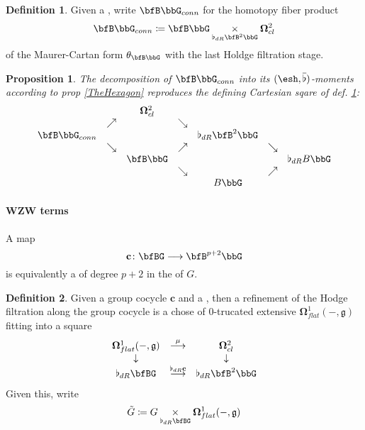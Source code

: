 \documentclass[12pt,titlepage]{article}
\newcommand{\itexarray}[1]{\begin{matrix}#1\end{matrix}}
\theoremstyle{plain}
\newtheorem{prop}{Proposition}
\theoremstyle{definition}
\newtheorem{defn}{Definition}
\theoremstyle{remark}
\begin{document}
\begin{defn}
\label{BGconn}\hypertarget{BGconn}{}
Given a , write $\bfB\bbG_{conn}$ for the homotopy fiber product
\begin{displaymath}
\bfB\bbG_{conn}
\coloneqq
\bfB\bbG\underset{\flat_{dR}\bfB^2\bbG}{\times} \mathbf{\Omega}^2_{cl}
\end{displaymath}
of the Maurer-Cartan form $\theta_{\bfB\bbG}$ with the last Holdge filtration stage.
\end{defn}
\begin{prop}
\label{}\hypertarget{}{}
The decomposition of $\bfB\bbG_{conn}$ into its $(\esh , \overline{\flat})$-moments according to prop \ref{TheHexagon} reproduces the defining Cartesian sqare of def. \ref{BGconn}:
\begin{displaymath}
\itexarray{
&& \mathbf{\Omega}^2_{cl}
\\
& \nearrow && \searrow
\\
\bfB\bbG_{conn}
&& &&
\flat_{dR}\bfB^2\bbG
\\
& \searrow && \nearrow && \searrow
\\
&& \bfB\bbG && &&  \flat_{dR}B \bbG
\\
&& & \searrow && \nearrow
\\
&& && B \bbG
}
\end{displaymath}
\end{prop}
\hypertarget{WZWTerms}{}\paragraph*{{WZW terms}}\label{WZWTerms}
A map
\begin{displaymath}
\mathbf{c} \colon \bfBG \longrightarrow \bfB^{p+2} \bbG
\end{displaymath}
is equivalently a  of degree $p+2$ in the  of $G$.
\begin{defn}
\label{FormRefinementOfCocycle}\hypertarget{FormRefinementOfCocycle}{}
Given a group cocycle $\mathbf{c}$ and a , then a refinement of the Hodge filtration along the group cocycle is a chose of 0-trucated extensive $\mathbf{\Omega}^1_{flat}(-,\mathfrak{g})$ fitting into a square
\begin{displaymath}
\itexarray{
\mathbf{\Omega}^1_{flat}(-,\mathfrak{g})
&\stackrel{\mu}{\longrightarrow}&
\mathbf{\Omega}^2_{cl}
\\
\downarrow && \downarrow
\\
\flat_{dR} \bfBG
&\stackrel{\flat_{dR}\mathbf{c}}{\longrightarrow}&
\flat_{dR} \bfB^2 \bbG
}
\end{displaymath}
Given this, write
\begin{displaymath}
\tilde G
\coloneqq G \underset{\flat_{dR}\bfBG}{\times} \mathbf{\Omega}^1_{flat}(-,\mathfrak{g})
\end{displaymath}
\end{defn}
\end{document}
